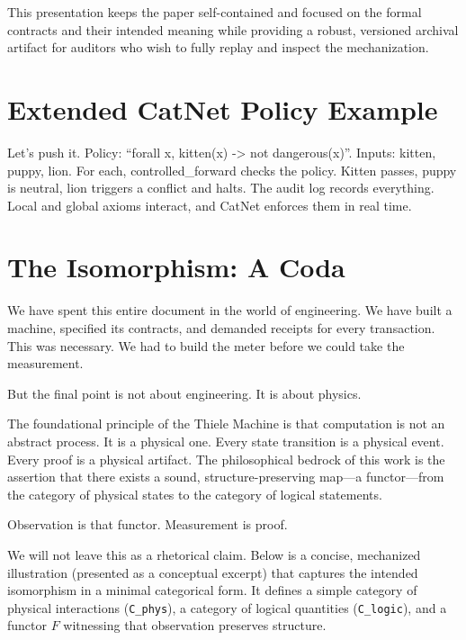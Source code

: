 \documentclass[11pt]{article}
\begin{document}
This presentation keeps the paper self-contained and focused on the formal contracts and their intended meaning while providing a robust, versioned archival artifact for auditors who wish to fully replay and inspect the mechanization.

\section{Extended CatNet Policy Example}
Let’s push it. Policy: ``forall x, kitten(x) -> not dangerous(x)''. Inputs: kitten, puppy, lion. For each, controlled\_forward checks the policy. Kitten passes, puppy is neutral, lion triggers a conflict and halts. The audit log records everything. Local and global axioms interact, and CatNet enforces them in real time.

\section{The Isomorphism: A Coda}
We have spent this entire document in the world of engineering. We have built a machine, specified its contracts, and demanded receipts for every transaction. This was necessary. We had to build the meter before we could take the measurement.

But the final point is not about engineering. It is about physics.

The foundational principle of the Thiele Machine is that computation is not an abstract process. It is a physical one. Every state transition is a physical event. Every proof is a physical artifact. The philosophical bedrock of this work is the assertion that there exists a sound, structure-preserving map—a functor—from the category of physical states to the category of logical statements.

Observation is that functor. Measurement is proof.

We will not leave this as a rhetorical claim. Below is a concise, mechanized illustration (presented as a conceptual excerpt) that captures the intended isomorphism in a minimal categorical form. It defines a simple category of physical interactions (\texttt{C\_phys}), a category of logical quantities (\texttt{C\_logic}), and a functor \(F\) witnessing that observation preserves structure.
\end{document}
